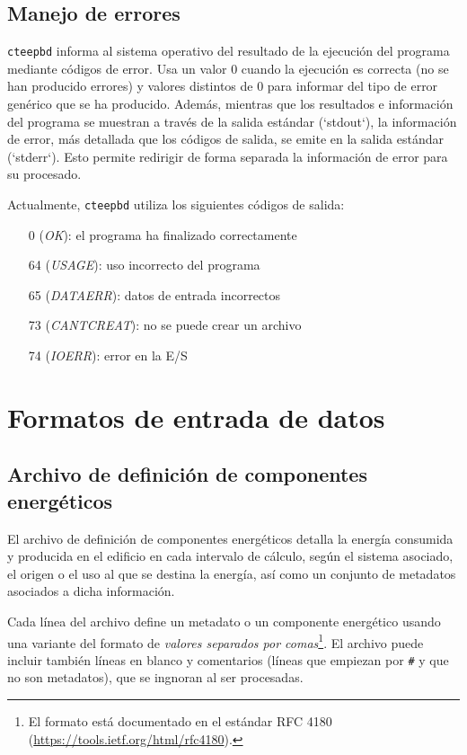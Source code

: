 \documentclass[10pt,notitlepage,oneside,a4paper]{article}
\begin{document}
\subsection{Manejo de errores}

\texttt{cteepbd} informa al sistema operativo del resultado de la ejecución del programa mediante códigos de error. Usa un valor 0 cuando la ejecución es correcta (no se han producido errores) y valores distintos de 0 para informar del tipo de error genérico que se ha producido. Además, mientras que los resultados e información del programa se muestran a través de la salida estándar (`stdout`), la información de error, más detallada que los códigos de salida, se emite en la salida estándar (`stderr`). Esto permite redirigir de forma separada la información de error para su procesado.

Actualmente, \texttt{cteepbd} utiliza los siguientes códigos de salida:

\begin{itemize}
    \item[0] (\textit{OK}): el programa ha finalizado correctamente
    \item[64] (\textit{USAGE}): uso incorrecto del programa
    \item[65] (\textit{DATAERR}): datos de entrada incorrectos
    \item[73] (\textit{CANTCREAT}): no se puede crear un archivo
    \item[74] (\textit{IOERR}): error en la E/S
\end{itemize}

\clearpage
\newpage
\section{Formatos de entrada de datos}

\subsection{Archivo de definición de componentes energéticos}\label{sec:formatocomponentes}

El archivo de definición de componentes energéticos detalla la energía consumida y producida en el edificio en cada intervalo de cálculo, según el sistema asociado, el origen o el uso al que se destina la energía, así como un conjunto de metadatos asociados a dicha información.

Cada línea del archivo define un metadato o un componente energético usando una variante del formato de \textit{valores separados por comas}\footnote{El formato está documentado en el estándar RFC 4180 (\url{https://tools.ietf.org/html/rfc4180}).}. El archivo puede incluir también líneas en blanco y comentarios (líneas que empiezan por \texttt{\#} y que no son metadatos), que se ingnoran al ser procesadas.
\end{document}
